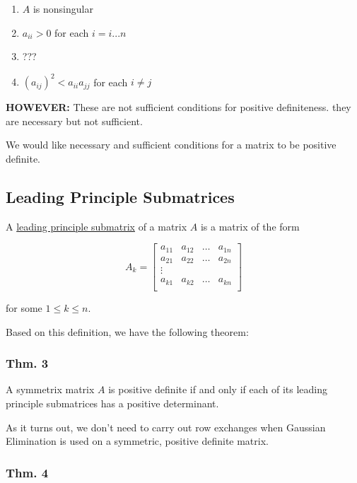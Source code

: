 \begin{enumerate}[label=(\alph*)]
\item $A$ is nonsingular
\item $a_{ii} > 0$ for each $i=i...n$ 
\item ???
\item $(a_{ij})^2 < a_{ii} a_{jj}$ for each $i\ne j$
\end{enumerate}

\textbf{HOWEVER:} These are not sufficient conditions for positive definiteness.
they are necessary but not sufficient.

We would like necessary and sufficient conditions for a matrix to be positive
definite.

\subsection{Leading Principle Submatrices}

A \uline{leading principle submatrix} of a matrix $A$ is a matrix of the form

\begin{equation*}
  A_k = \begin{bmatrix}
    a_{11} & a_{12} & \dots & a_{1n}\\
    a_{21} & a_{22} & \dots & a_{2n}\\
   \vdots&  &  & \\
   a_{k1} & a_{k2} & \dots & a_{kn}\\
  \end{bmatrix}
\end{equation*}

for some $1 \leq k \leq n$.

Based on this definition, we have the following theorem:

\subsubsection{Thm. 3}

A symmetrix matrix $A$ is positive definite if and only if each of its leading
principle submatrices has a positive determinant.

As it turns out, we don't need to carry out row exchanges when Gaussian
Elimination is used on a symmetric, positive definite matrix.

\subsubsection{Thm. 4}

